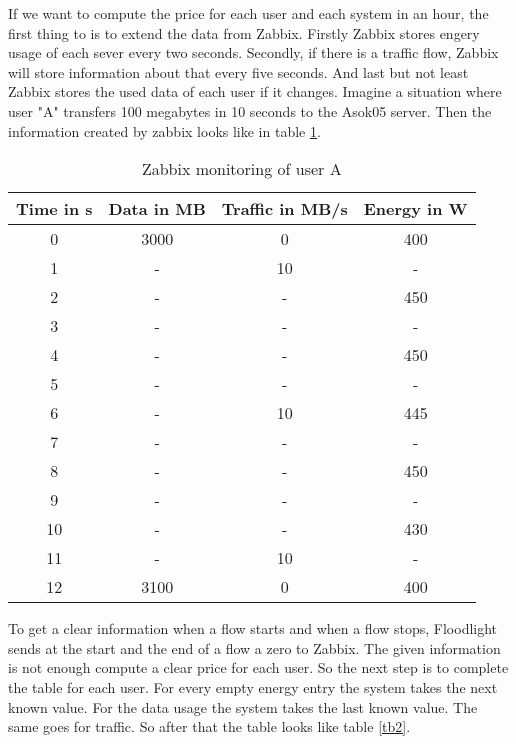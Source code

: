  If we want to compute the price for each user and each system in an hour, the first thing to is to extend the data from Zabbix. Firstly Zabbix stores engery usage of each sever every two seconds. Secondly, if there is a traffic flow, Zabbix will store information about that every five seconds. And last but not least Zabbix stores the used data of each user if it changes. Imagine a situation where user "A" transfers 100 megabytes in 10 seconds to the Asok05 server. Then the information created by zabbix looks like in table \ref{tb1}. 
\begin{table}
\centering
\caption{Zabbix monitoring of user A}
\begin{tabular}{|c|c|c|c|}
 \hline Time in s & Data in MB & Traffic in MB/s & Energy in W \\ 
  \hline 0 & 3000 & 0 & 400 \\ 
 \hline 1 & - & 10 & - \\ 
 \hline 2 & - & - & 450 \\ 
 \hline 3 & - & - & -\\ 
 \hline 4 & - & - & 450 \\ 
 \hline 5 & - & - & - \\
 \hline 6 & - & 10 & 445 \\ 
 \hline 7 & - & - & -\\ 
 \hline 8 & - & - & 450 \\ 
 \hline 9 & - & - & - \\  
 \hline 10 & - & - & 430 \\
  \hline 11 & - & 10 & - \\
 \hline 12 & 3100 & 0 & 400 \\  
 \hline 
 \end{tabular}
 \label{tb1} 
 \end{table}
 
 To get a clear information when a flow starts and when a flow stops, Floodlight sends at the start and the end of a flow a zero to Zabbix. The given information is not enough compute a clear price for each user. So the next step is to complete the table for each user. For every empty energy entry the system takes the next known value. For the data usage the system takes the last known value. The same goes for traffic. So after that the table looks like table \ref{tb2}.
 
